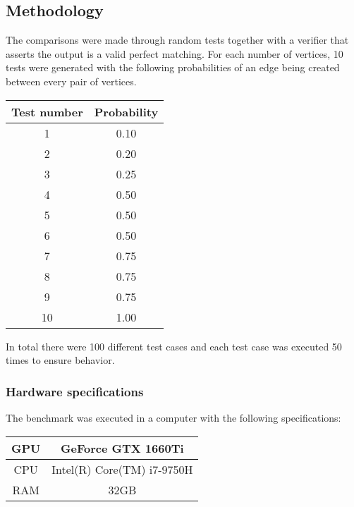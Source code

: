 \subsection{Methodology}
The comparisons were made through random tests together with a verifier that asserts the output is a valid perfect matching.
For each number of vertices, 10 tests were generated with the following probabilities of an edge being created between every pair of vertices.
\begin{center}
  \begin{tabular}{|c|c|}
    \hline
    Test number & Probability \\
    \hline
    1 & 0.10 \\
    2 & 0.20 \\
    3 & 0.25 \\
    4 & 0.50 \\
    5 & 0.50 \\
    6 & 0.50 \\
    7 & 0.75 \\
    8 & 0.75 \\
    9 & 0.75 \\
    10 & 1.00 \\
    \hline
  \end{tabular}
\end{center}

In total there were 100 different test cases and each test case was executed 50 times to ensure behavior.

\subsubsection{Hardware specifications}

\noindent
The benchmark was executed in a computer with the following specifications:

\begin{center}
  \begin{tabular}{|c|c|}
    \hline
    GPU & GeForce GTX 1660Ti \\
    \hline
    CPU & Intel(R) Core(TM) i7-9750H \\
    \hline
    RAM & 32GB \\ 
    \hline
  \end{tabular}
\end{center}

